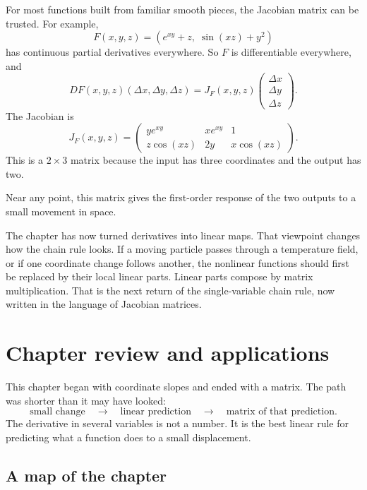 For most functions built from familiar smooth pieces, the Jacobian matrix can be trusted.
For example,
\[
    F(x,y,z)=
    \left(
        e^{xy}+z,\;
        \sin(xz)+y^2
    \right)
\]
has continuous partial derivatives everywhere.  So \(F\) is differentiable everywhere,
and
\[
    DF(x,y,z)(\Delta x,\Delta y,\Delta z)
    =
    J_F(x,y,z)
    \begin{pmatrix}
        \Delta x\\
        \Delta y\\
        \Delta z
    \end{pmatrix}.
\]
The Jacobian is
\[
\boxed{
J_F(x,y,z)
=
\begin{pmatrix}
    ye^{xy} & xe^{xy} & 1\\
    z\cos(xz) & 2y & x\cos(xz)
\end{pmatrix}.
}
\]
This is a \(2\times3\) matrix because the input has three coordinates and the output
has two.

Near any point, this matrix gives the first-order response of the two outputs to a small
movement in space.

The chapter has now turned derivatives into linear maps.  That viewpoint changes how
the chain rule looks.  If a moving particle passes through a temperature field, or if one
coordinate change follows another, the nonlinear functions should first be replaced by
their local linear parts.  Linear parts compose by matrix multiplication.  That is the
next return of the single-variable chain rule, now written in the language of Jacobian
matrices.
\section{Chapter review and applications}
\label{sec:7.7}

This chapter began with coordinate slopes and ended with a matrix.  The path was
shorter than it may have looked:
\[
    \text{small change}
    \quad\longrightarrow\quad
    \text{linear prediction}
    \quad\longrightarrow\quad
    \text{matrix of that prediction}.
\]
The derivative in several variables is not a number.  It is the best linear rule for
predicting what a function does to a small displacement.

\subsection*{A map of the chapter}

